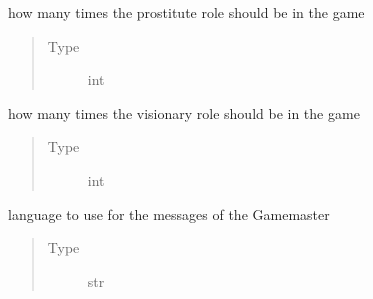 \documentclass[letterpaper,10pt,english]{sphinxmanual}
\begin{document}
\begin{fulllineitems}
\begin{fulllineitems}
\label{\detokenize{chatwolf:chatwolf.game.Game.num_prostitute}}
how many times the prostitute role should be in the game
\begin{quote}\begin{description}
\item[{Type}] \leavevmode
int

\end{description}\end{quote}

\end{fulllineitems}


\begin{fulllineitems}
\label{\detokenize{chatwolf:chatwolf.game.Game.num_visionary}}
how many times the visionary role should be in the game
\begin{quote}\begin{description}
\item[{Type}] \leavevmode
int

\end{description}\end{quote}

\end{fulllineitems}


\begin{fulllineitems}
\label{\detokenize{chatwolf:chatwolf.game.Game.lang}}
language to use for the messages of the Game\sphinxhyphen{}master
\begin{quote}\begin{description}
\item[{Type}] \leavevmode
str

\end{description}\end{quote}

\end{fulllineitems}



\end{fulllineitems}
\end{document}
